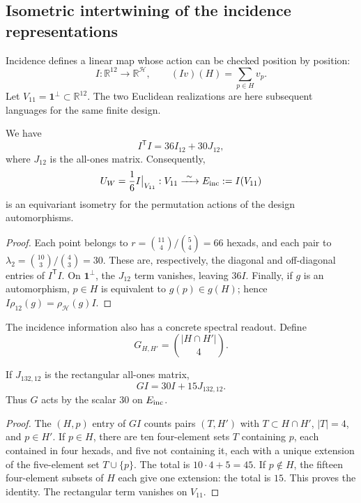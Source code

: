 

\subsection{Isometric intertwining of the incidence representations}
\label{exc:entrelazador}

Incidence defines a linear map whose action can be checked
position by position:
\begin{equation}
 I:\mathbb R^{12}\longrightarrow\mathbb R^{\mathcal H},
 \qquad (Iv)(H)=\sum_{p\in H}v_p.
 \label{exc:incidencia}
\end{equation}
Let $V_{11}=\mathbf1^\perp\subset\mathbb R^{12}$. The two Euclidean
realizations are here subsequent languages for the same finite design.

\begin{proposition}
\label{exc:isometria}
We have
\[
 I^{\mathsf T}I=36I_{12}+30J_{12},
\]
where $J_{12}$ is the all-ones matrix. Consequently,
\[
 U_W=\frac16 I\big|_{V_{11}}:
 V_{11}\xrightarrow{\ \sim\ }E_{\rm inc}:=I(V_{11})
\]
is an equivariant isometry for the permutation actions of the
design automorphisms.
\end{proposition}

\begin{proof}
Each point belongs to
$r=\binom{11}{4}/\binom54=66$ hexads, and each pair to
$\lambda_2=\binom{10}{3}/\binom43=30$. These are, respectively, the
diagonal and off-diagonal entries of $I^{\mathsf T}I$. On
$\mathbf1^\perp$, the $J_{12}$ term vanishes, leaving $36I$.
Finally, if $g$ is an automorphism, $p\in H$ is equivalent to
$g(p)\in g(H)$; hence $I\rho_{12}(g)=\rho_{\mathcal H}(g)I$.
\end{proof}

The incidence information also has a concrete spectral
readout. Define
\[
 G_{H,H'}=\binom{|H\cap H'|}{4}.
\]

\begin{lemma}
\label{exc:espectro}
If $J_{132,12}$ is the rectangular all-ones matrix,
\[
 GI=30I+15J_{132,12}.
\]
Thus $G$ acts by the scalar $30$ on $E_{\rm inc}$.
\end{lemma}

\begin{proof}
The $(H,p)$ entry of $GI$ counts pairs $(T,H')$ with
$T\subset H\cap H'$, $|T|=4$, and $p\in H'$. If $p\in H$, there are ten
four-element sets $T$ containing $p$, each contained in four hexads,
and five not containing it, each with a unique extension of the
five-element set $T\cup\{p\}$. The total is $10\cdot4+5=45$.
If $p\notin H$, the fifteen four-element subsets of $H$ each give one
extension: the total is $15$. This proves the identity. The rectangular term
vanishes on $V_{11}$.
\end{proof}

